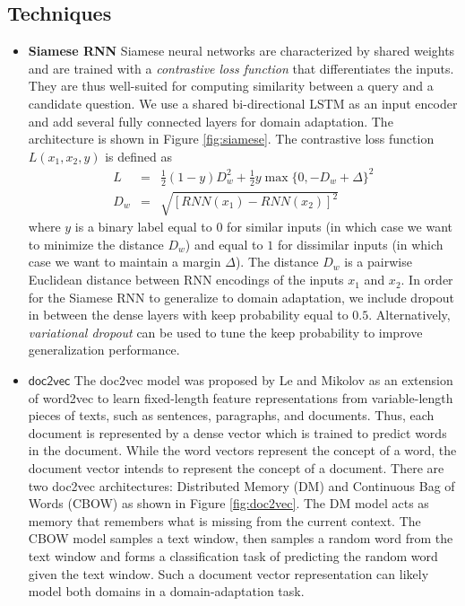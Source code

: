 \documentclass{sigkddExp}
\begin{document}
\subsection{Techniques}
\begin{itemize}[topsep=0pt,itemsep=-1ex,partopsep=1ex,parsep=1ex]

\item \textbf{Siamese RNN} 
 Siamese neural networks \cite{siamese} are characterized by shared weights and are trained with a \textit{contrastive loss function} that differentiates the inputs. They are thus well-suited for computing similarity between a query and a candidate question. We use a shared bi-directional LSTM as an input encoder and add several fully connected layers for domain adaptation. The architecture is shown in Figure \ref{fig:siamese}. The contrastive loss function $L(x_1,x_2,y)$ is defined as
\begin{eqnarray}
L &=& \frac{1}{2}(1-y)D_{w}^{2} + \frac{1}{2}y \max \{0, -D_w + \Delta\}^{2} \\
D_w &=& \sqrt{[RNN(x_1) - RNN(x_2)]^2}
\end{eqnarray}
where $y$ is a binary label equal to $0$ for similar inputs (in which case we want to minimize the distance $D_w$) and equal to $1$ for dissimilar inputs (in which case we want to maintain a margin $\Delta$). The distance $D_w$ is a pairwise Euclidean distance between RNN encodings of the inputs $x_1$ and $x_2$. In order for the Siamese RNN to generalize to domain adaptation, we include dropout\cite{srivastava2014dropout} in between the dense layers with keep probability equal to $0.5$. Alternatively, \textit{variational dropout}\cite{kingma2015variational} can be used to tune the keep probability to improve generalization performance.

\item \textbf{$\textsf{doc2vec}$} The \textsf{doc2vec} model was proposed by Le and Mikolov \cite{doc2vec1} as an extension of word2vec to learn fixed-length feature representations from variable-length pieces of texts, such as sentences, paragraphs, and documents. Thus, each document is represented by a dense vector which is trained to predict words in the document. While the word vectors represent the concept of a word, the document vector intends to represent the concept of a document. There are two doc2vec architectures: Distributed Memory (DM) and Continuous Bag of Words (CBOW) as shown in Figure \ref{fig:doc2vec}. The DM model acts as memory that remembers what is missing from the current context. The CBOW model samples a text window, then samples a random word from the text window and forms a classification task of predicting the random word given the text window. Such a document vector representation can likely model both domains in a domain-adaptation task.
\end{itemize}
\end{document}

